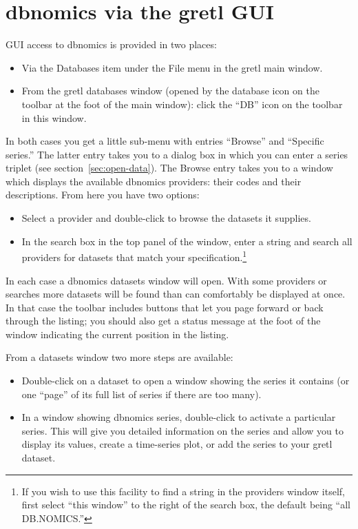 \documentclass{article}
\begin{document}
\section{dbnomics via the gretl GUI}
\label{sec:dbn-gui}

GUI access to \textsf{dbnomics} is provided in two places:
\begin{itemize}
\item Via the \textsf{Databases} item under the \textsf{File} menu in
  the gretl main window.
\item From the gretl databases window (opened by the database icon on
  the toolbar at the foot of the main window): click the ``DB'' icon
  on the toolbar in this window.
\end{itemize}
In both cases you get a little sub-menu with entries
``\textsf{Browse}'' and ``\textsf{Specific series}.'' The latter entry
takes you to a dialog box in which you can enter a series triplet (see
section~\ref{sec:open-data}). The \textsf{Browse} entry takes you to a
window which displays the available \textsf{dbnomics} providers: their
codes and their descriptions. From here you have two options:
\begin{itemize}
\item Select a provider and double-click to browse the datasets it
  supplies.
\item In the search box in the top panel of the window, enter a string
  and search all providers for datasets that match your
  specification.\footnote{If you wish to use this facility to find a
    string in the providers window itself, first select ``\textsf{this
      window}'' to the right of the search box, the default being
    ``\textsf{all DB.NOMICS}.''}
\end{itemize}

In each case a \textsf{dbnomics} datasets window will open. With some
providers or searches more datasets will be found than can comfortably
be displayed at once. In that case the toolbar includes buttons that
let you page forward or back through the listing; you should also get
a status message at the foot of the window indicating the current
position in the listing.

From a datasets window two more steps are available:
\begin{itemize}
\item Double-click on a dataset to open a window showing the series it
  contains (or one ``page'' of its full list of series if there are
  too many).
\item In a window showing \textsf{dbnomics} series, double-click to
  activate a particular series. This will give you detailed
  information on the series and allow you to display its values,
  create a time-series plot, or add the series to your gretl dataset.
\end{itemize}
\end{document}
